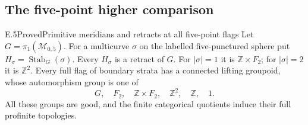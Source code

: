 \subsection{The five-point higher comparison}

\begin{result}{E.5}{Proved}{Primitive meridians and retracts at all five-point flags}
Let $G=\pi_1(\mathcal M_{0,5})$.  For a multicurve $\sigma$ on the
labelled five-punctured sphere put $H_\sigma=\operatorname{Stab}_G(\sigma)$.
Every $H_\sigma$ is a retract of $G$.  For $|\sigma|=1$ it is
$\mathbb Z\times F_2$; for $|\sigma|=2$ it is $\mathbb Z^2$.
Every full flag of boundary strata has a connected lifting groupoid,
whose automorphism group is one of
\[
 G,\quad F_2,\quad \mathbb Z\times F_2,\quad
 \mathbb Z^2,\quad\mathbb Z,\quad 1.                         \tag{E.4}
\]
All these groups are good, and the finite categorical quotients induce
their full profinite topologies.
\end{result}

